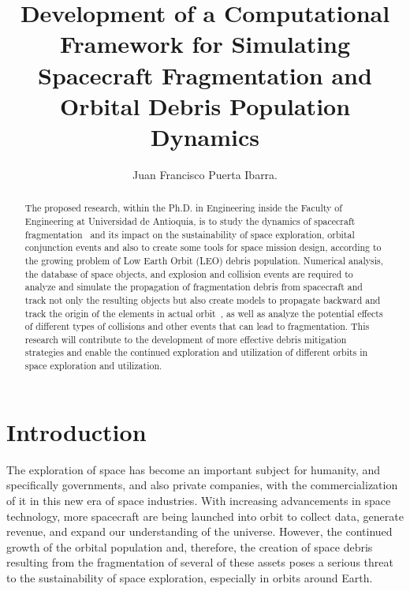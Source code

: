 \documentclass[11pt]{article} %
\title{Development of a Computational Framework for Simulating Spacecraft Fragmentation and Orbital Debris Population Dynamics}
\author{Juan Francisco Puerta Ibarra.}
\date{}
\begin{document}
\maketitle

\tableofcontents
\newpage

\begin{abstract}
The proposed research, within the Ph.D. in Engineering inside the Faculty of Engineering at Universidad de Antioquia, is to study the dynamics of spacecraft fragmentation~\cite{mains_impact_2021} and its impact on the sustainability of space exploration, orbital conjunction events and also to create some tools for space mission design, according to the growing problem of Low Earth Orbit (LEO) debris population. Numerical analysis, the database of space objects, and explosion and collision events are required to analyze and simulate the propagation of fragmentation debris from spacecraft and track not only the resulting objects but also create models to propagate backward and track the origin of the elements in actual orbit~\cite{letizia_analytical_2014}, as well as analyze the potential effects of different types of collisions and other events that can lead to fragmentation. This research will contribute to the development of more effective debris mitigation strategies and enable the continued exploration and utilization of different orbits in space exploration and utilization.
\end{abstract}

\section{Introduction}

The exploration of space has become an important subject for humanity, and specifically governments, and also private companies, with the commercialization of it in this new era of space industries. With increasing advancements in space technology, more spacecraft are being launched into orbit to collect data, generate revenue, and expand our understanding of the universe. However, the continued growth of the orbital population and, therefore, the creation of space debris resulting from the fragmentation of several of these assets poses a serious threat to the sustainability of space exploration, especially in orbits around Earth. 
\end{document}
